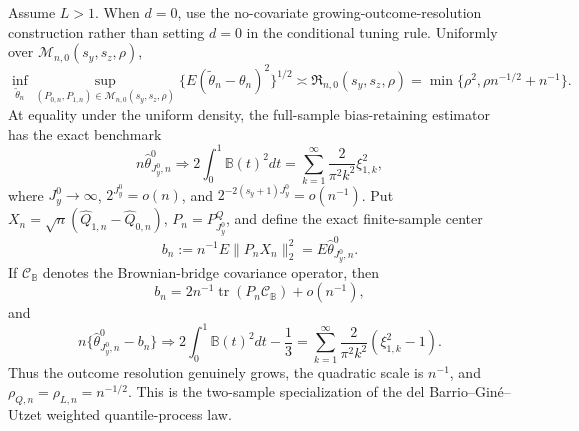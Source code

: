 Assume \(L>1\). When \(d=0\), use the no-covariate growing-outcome-resolution construction rather than setting \(d=0\) in the conditional tuning rule. Uniformly over \(\mathcal M_{n,0}(s_y,s_z,\rho)\),
\[
\inf_{\widetilde\theta_n}\sup_{(P_{0,n},P_{1,n})\in\mathcal M_{n,0}(s_y,s_z,\rho)}\{E(\widetilde\theta_n-\theta_n)^2\}^{1/2}\asymp\mathfrak R_{n,0}(s_y,s_z,\rho)=\min\{\rho^2,\rho n^{-1/2}+n^{-1}\}.
\]
At equality under the uniform density, the full-sample bias-retaining estimator has the exact benchmark
\[
n\widehat\theta^0_{J_y^0,n}\Rightarrow2\int_0^1\mathbb B(t)^2dt=\sum_{k=1}^{\infty}\frac{2}{\pi^2k^2}\xi_{1,k}^2,
\]
where \(J_y^0\to\infty\), \(2^{J_y^0}=o(n)\), and \(2^{-2(s_y+1)J_y^0}=o(n^{-1})\). Put \(X_n=\sqrt n(\widehat Q_{1,n}-\widehat Q_{0,n})\), \(P_n=P^Q_{J_y^0}\), and define the exact finite-sample center
\[
b_n:=n^{-1}E\|P_nX_n\|_2^2=E\widehat\theta^0_{J_y^0,n}.
\]
If \(\mathcal C_{\mathbb B}\) denotes the Brownian-bridge covariance operator, then
\[
b_n=2n^{-1}\operatorname{tr}(P_n\mathcal C_{\mathbb B})+o(n^{-1}),
\]
and
\[
n\{\widehat\theta^0_{J_y^0,n}-b_n\}
\Rightarrow2\int_0^1\mathbb B(t)^2dt-\frac13
=\sum_{k=1}^{\infty}\frac{2}{\pi^2k^2}(\xi_{1,k}^2-1).
\]
Thus the outcome resolution genuinely grows, the quadratic scale is \(n^{-1}\), and \(\rho_{Q,n}=\rho_{L,n}=n^{-1/2}\). This is the two-sample specialization of the del Barrio--Gin\'e--Utzet weighted quantile-process law.